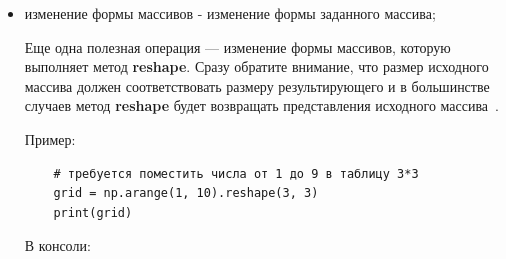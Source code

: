 \documentclass[pract]{SCWorks}
\begin{document}
\begin{itemize}
    Вот как это работает:

    Извлекаем двумерный подмассив $2 \times 2$. При изменении извлечённого подмассива изменяется и исходный массив.
    \begin{verbatim}
    arr_for_views = np.array([[12, 1, 3, 7],
                          [4, 0, 2, 3],
                          [0, 0, 6, 9]])
    arr_for_views_sub = arr_for_views[:2, :2]
    print(arr_for_views_sub)
    arr_for_views_sub[0, 0] = 75
    print(arr_for_views_sub)
    print(arr_for_views) 
    \end{verbatim}

    \begin{verbatim}
        [[12  1]
        [ 4  0]]
    
        [[75  1]
        [ 4  0]]
    
        [[75  1  3  7]
        [ 4  0  2  3]
        [ 0  0  6  9]]
    \end{verbatim}

    При работе с большими данными \textbf{представления} позволяют обрабатывать их фрагменты без копирования данных 
    в промежуточный буфер, а значит снижаются затраты на память, что критично при работе с действительно 
    большими объёмами данных.

    Но если всё-таки требуется независимая копия фрагмента (чтобы изменения в срезе не влияли на исходный массив), 
    следует использовать метод copy(): 
    
    \begin{verbatim}
    arr_copy = arr_for_views[:2, :2].copy()
    \end{verbatim}
 
    \item изменение формы массивов - изменение формы заданного массива;
    
    Еще одна полезная операция — изменение формы массивов, которую выполняет метод \textbf{reshape}. 
    Сразу обратите внимание, что размер исходного массива должен соответствовать размеру результирующего и в 
    большинстве случаев метод \textbf{reshape} будет возвращать представления исходного массива~\cite{vanderplas}.

    Пример:

    \begin{verbatim}
    # требуется поместить числа от 1 до 9 в таблицу 3*3
    grid = np.arange(1, 10).reshape(3, 3)
    print(grid)
    \end{verbatim}

    В консоли:


\end{itemize}
\end{document}
